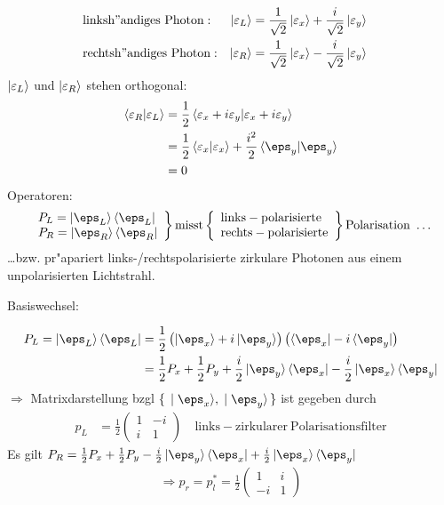 \documentclass[a4paper]{scrartcl}
\begin{document}
{\begin{align}
& \mathrm{linksh"andiges \ Photon:} &  \ket {\varepsilon_L } & = \frac1{\sqrt2} \ket{\varepsilon_x} + \frac i {\sqrt2} \ket{\varepsilon_y} &  &\\
& \mathrm{rechtsh"andiges \ Photon:} & \ket {\varepsilon_R } & = \frac1{\sqrt2} \ket{\varepsilon_x} - \frac i {\sqrt2} \ket{\varepsilon_y} 
\end{align}
$\ket {\varepsilon_L}$ und $\ket{\varepsilon_R}$ stehen orthogonal:
\begin{align}
\begin{split}
\braket{ \varepsilon_R | \varepsilon_L} & = \frac12 \braket{ \varepsilon_x + i \varepsilon_y | \varepsilon_x + i \varepsilon_y } \\
& = \frac12 \braket{ \varepsilon_x | \varepsilon_x } + \frac{i^2}2 \braket{\eps_y | \eps_y} \\
& = 0 
\end{split}
\end{align}
Operatoren: 
\begin{align}
\left.
\begin{array}{l}
P_L = \ket{ \eps_L} \bra{ \eps_L} \\
P_R = \ket{ \eps_R} \bra {\eps_R} 
\end{array}
\right\}
\mathrm{ misst } \left\{
\begin{array}{l}
\mathrm{links-polarisierte}\\
\mathrm{rechts-polarisierte}
\end{array}
\right\} 
\mathrm{ Polarisation \ \ldots}
\end{align}
\ldots bzw. pr"apariert links-/rechtspolarisierte zirkulare Photonen aus einem unpolarisierten Lichtstrahl.

Basiswechsel:

\begin{align}
\begin{split}
P_L = \ket{\eps_L} \bra{\eps_L} & = \frac 12 \left( \ket {\eps_x } + i \ket{ \eps_y} \right) \left( \bra{\eps_x} - i \bra{\eps_y} \right) \\
& = \frac12 P_x + \frac12 P_y + \frac i 2 \ket {\eps_y}\bra{\eps_x} - \frac i 2 \ket{ \eps_x } \bra {\eps_y}
\end{split}
\end{align}
$\Longrightarrow$ Matrixdarstellung bzgl $\set{ \ket{ \eps_x}, \ket{ \eps_y}}$ ist gegeben durch 
\begin{align}
p_L & = \frac12 \begin{pmatrix} 1 & -i \\ i & 1 \end{pmatrix} \quad \mathrm{ links-zirkularer \ Polarisationsfilter}
\end{align}
Es gilt $P_R = \frac12 P_x + \frac12 P_y - \frac i2 \ket{\eps_y}  \bra{ \eps_x} + \frac i2 \ket{ \eps_x} \bra{ \eps_y}$
\begin{align}
\Longrightarrow p_r = p_l^* = \frac12 \begin{pmatrix} 1 & i \\ -i & 1 \end{pmatrix}
\end{align}

}
\end{document}
